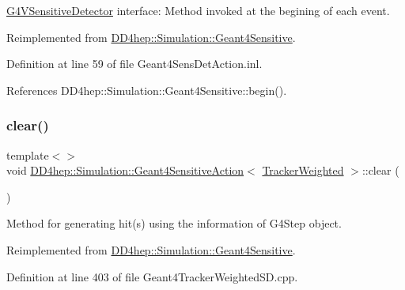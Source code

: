 \hyperlink{class_g4_v_sensitive_detector}{G4\+V\+Sensitive\+Detector} interface\+: Method invoked at the begining of each event. 



Reimplemented from \hyperlink{class_d_d4hep_1_1_simulation_1_1_geant4_sensitive_a2967b095e6c32ae82f68a8b25a086c86}{D\+D4hep\+::\+Simulation\+::\+Geant4\+Sensitive}.



Definition at line 59 of file Geant4\+Sens\+Det\+Action.\+inl.



References D\+D4hep\+::\+Simulation\+::\+Geant4\+Sensitive\+::begin().

\hypertarget{class_d_d4hep_1_1_simulation_1_1_geant4_sensitive_action_a37038afed1f3cc353e9b16a264d505ec}{}\label{class_d_d4hep_1_1_simulation_1_1_geant4_sensitive_action_a37038afed1f3cc353e9b16a264d505ec} 
\subsubsection{\texorpdfstring{clear()}{clear()}\hspace{0.1cm}{\footnotesize\ttfamily [1/3]}}
{\footnotesize\ttfamily template$<$$>$ \\
void \hyperlink{class_d_d4hep_1_1_simulation_1_1_geant4_sensitive_action}{D\+D4hep\+::\+Simulation\+::\+Geant4\+Sensitive\+Action}$<$ \hyperlink{struct_d_d4hep_1_1_simulation_1_1_tracker_weighted}{Tracker\+Weighted} $>$\+::clear (\begin{DoxyParamCaption}\item[{G4\+H\+Cof\+This\+Event $\ast$}]{ }\end{DoxyParamCaption})\hspace{0.3cm}{\ttfamily [virtual]}}



Method for generating hit(s) using the information of G4\+Step object. 



Reimplemented from \hyperlink{class_d_d4hep_1_1_simulation_1_1_geant4_sensitive_a3bb1c2f79261a98e83ec22102281d117}{D\+D4hep\+::\+Simulation\+::\+Geant4\+Sensitive}.



Definition at line 403 of file Geant4\+Tracker\+Weighted\+S\+D.\+cpp.



